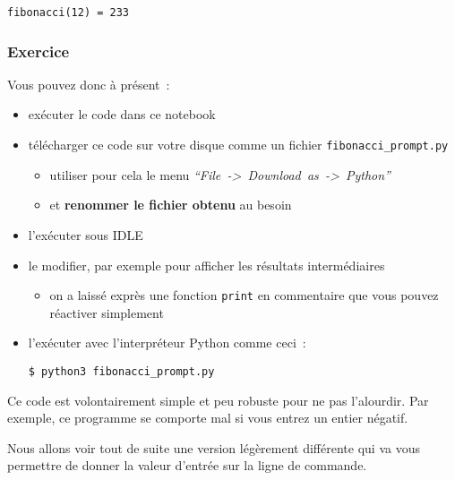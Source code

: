     \begin{Verbatim}[commandchars=\\\{\}]
fibonacci(12) = 233

    \end{Verbatim}

    \hypertarget{exercice}{%
\subsubsection{Exercice}\label{exercice}}

    Vous pouvez donc à présent~:

\begin{itemize}
\item
  exécuter le code dans ce notebook
\item
  télécharger ce code sur votre disque comme un fichier
  \texttt{fibonacci\_prompt.py}

  \begin{itemize}
  \tightlist
  \item
    utiliser pour cela le menu
    \emph{``File~-\textgreater{}~Download~as~-\textgreater{}~Python''}
  \item
    et \textbf{renommer le fichier obtenu} au besoin
  \end{itemize}
\item
  l'exécuter sous IDLE
\item
  le modifier, par exemple pour afficher les résultats intermédiaires

  \begin{itemize}
  \tightlist
  \item
    on a laissé exprès une fonction \texttt{print} en commentaire que
    vous pouvez réactiver simplement
  \end{itemize}
\item
  l'exécuter avec l'interpréteur Python comme ceci~:

  \texttt{\$\ python3\ fibonacci\_prompt.py}
\end{itemize}

    Ce code est volontairement simple et peu robuste pour ne pas l'alourdir.
Par exemple, ce programme se comporte mal si vous entrez un entier
négatif.

    Nous allons voir tout de suite une version légèrement différente qui va
vous permettre de donner la valeur d'entrée sur la ligne de commande.


    
    
    
